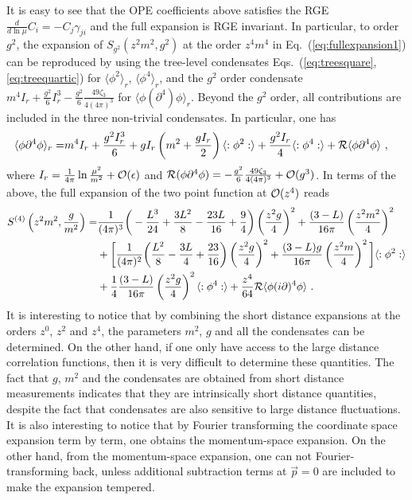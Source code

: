 \documentclass[a4paper,11pt]{article}
\begin{document}
It is easy to see that the OPE coefficients above satisfies the RGE $\frac{d}{d\ln \mu}C_i=-C_j\gamma_{ji}$ and the full expansion is RGE invariant. In particular, to order $g^2$, the expansion of $S_{g^2}(z^2m^2,g^2)$ at the order $z^4m^4$ in Eq.~(\ref{eq:fullexpansion1}) 
can be reproduced by using the tree-level condensates Eqs.~(\ref{eq:treesquare}, \ref{eq:treequartic}) for $\langle \phi^2\rangle_r$, $\langle \phi^4\rangle_r$, and the $g^2$ order condensate $m^4I_r+\frac{g^2}{6}I_r^3-\frac{g^2}{6}\frac{49\zeta_3}{4(4\pi)^3}$ for $\langle \phi(\partial^4)\phi \rangle_r$. Beyond the $g^2$ order, all contributions are included in the three non-trivial condensates. In particular, one has 
\begin{align}
\langle \phi \partial^4\phi\rangle_r=&m^4I_r+\frac{g^2 I_r^3}{6}+gI_r\left(m^2+\frac{gI_r}{2}\right)\langle :\phi^2:\rangle+\frac{g^2I_r}{4}\langle:\phi^4:\rangle+{\cal R}\langle \phi \partial^4 \phi\rangle \ ,
\end{align}
where $I_r=\frac{1}{4\pi}\ln \frac{\mu^2}{m^2}+{\cal O}(\epsilon)$ and ${\cal R}(\phi \partial^4 \phi)=-\frac{g^2}{6}\frac{49\zeta_3}{4(4\pi)^3}+{\cal O}(g^3)$.  In terms of the above, the full expansion of the two point function at ${\cal O}(z^4)$ reads
\begin{align}
S^{(4)}\left(z^2m^2,\frac{g}{m^2}\right) =&\frac{1}{(4\pi)^3}\bigg(-\frac{L^3}{24}+\frac{3 L^2}{8}-\frac{23L}{16}+\frac{9}{4}\bigg)\left(\frac{z^2g}{4}\right)^2+\frac{(3-L)}{16 \pi }\left(\frac{z^2m^2}{4}\right)^2 \nonumber \\ 
&+\bigg[\frac{1}{(4\pi)^2}\bigg(\frac{ L^2}{8}-\frac{3L}{4}+\frac{23}{16}\bigg)\left(\frac{z^2g}{4}\right)^2+\frac{ (3-L) g}{16 \pi }\left(\frac{z^2m}{4}\right)^2\bigg]\langle:\phi^2:\rangle \nonumber \\ 
&+\frac{1}{4}\frac{(3-L)}{16 \pi }\left(\frac{z^2g}{4}\right)^2 \langle :\phi^4: \rangle +\frac{z^4}{64} {\cal R}\langle \phi(i\partial)^4\phi \rangle \ .
\end{align}
It is interesting to notice that by combining the short distance expansions at the orders $z^0$, $z^2$ and $z^4$, the parameters $m^2$, $g$ and all the condensates can be determined. On the other hand, if one only have access to the large distance correlation functions, then it is very difficult to determine these quantities. The fact that $g$, $m^2$ and the condensates are obtained from short distance measurements indicates that they are intrinsically short distance quantities, despite the fact that condensates are also sensitive to large distance fluctuations.  It is also interesting to notice that by Fourier transforming the coordinate space expansion term by term, one obtains the momentum-space expansion. On the other hand, from the momentum-space expansion, one can not Fourier-transforming back, unless additional subtraction terms at $\vec{p}=0$ are included to make the expansion tempered. 
\end{document}
